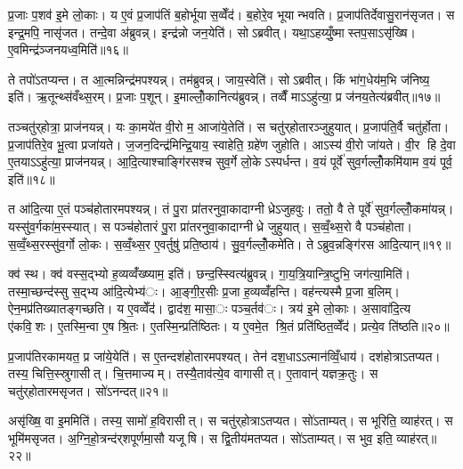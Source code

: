 प्र॒जाः प॒शव॑ इ॒मे लो॒काः। य ए॒वं प्र॒जाप॑तिं ब॒होर्भूयास॒व्वेँद॑। ब॒होरे॒व भूयान्भवति। प्र॒जाप॑तिर्देवासु॒रान॑सृजत। स इन्द्र॒मपि॒ नासृ॑जत। तन्दे॒वा अ॑ब्रुवन्न्। इन्द्र॑न्नो जन॒येति॑। सोऽब्रवीत्। यथा॒ऽहय्युँ॒ष्मास्तप॒साऽसृ॑ख्षि। ए॒वमिन्द्र॑ञ्जनयध्व॒मिति॑॥१६॥

ते तपो॑ऽतप्यन्त। त आ॒त्मन्निन्द्र॑मपश्यन्न्। तम॑ब्रुवन्न्। जाय॒स्वेति॑। सोऽब्रवीत्। किं भा॑ग॒धेय॑म॒भि ज॑निष्य॒ इति॑। ऋ॒तून्थ्स॑वँथ्स॒रम्। प्र॒जाः प॒शून्। इ॒माल्लोँ॒कानित्य॑ब्रुवन्न्। तव्वैँ माऽऽहु॑त्या॒ प्र ज॑नय॒तेत्य॑ब्रवीत्॥१७॥

तञ्चतु॑र्‌होत्रा॒ प्राज॑नयन्न्। यः का॒मये॑त वी॒रो म॒ आजा॑ये॒तेति॑। स चतु॑र्‌होतारञ्जुहुयात्। प्र॒जाप॑ति॒र्वै चतु॑र्होता। प्र॒जाप॑तिरे॒व भू॒त्वा प्रजा॑यते। ज॒जन॒दिन्द्र॑मिन्द्रि॒याय॒ स्वाहेति॒ ग्रहे॑ण जुहोति। आऽस्य॑ वी॒रो जा॑यते। वी॒र हि दे॒वा ए॒तयाऽऽहु॑त्या॒ प्राज॑नयन्न्। आ॒दि॒त्याश्चाङ्गि॑रसश्च सुव॒र्गे लो॒केऽस्पर्धन्त। व॒यं पूर्वे॑ सुव॒र्गल्लोँ॒कमि॑याम व॒यं पूर्व॒ इति॑॥१८॥

त आ॑दि॒त्या ए॒तं पञ्च॑होतारमपश्यन्न्। तं पु॒रा प्रा॑तरनुवा॒कादाग्नीध्रेऽजुहवुः। ततो॒ वै ते पूर्वे॑ सुव॒र्गल्लोँ॒कमा॑यन्न्। यस्सु॑व॒र्गका॑म॒स्स्यात्। स पञ्च॑होतारं पु॒रा प्रा॑तरनुवा॒कादाग्नीध्रे जुहुयात्। स॒व्वँ॒थ्स॒रो वै पञ्च॑होता। स॒व्वँ॒थ्स॒रस्सु॑व॒र्गो लो॒कः। स॒व्वँ॒थ्स॒र ए॒वर्तुषु॑ प्रति॒ष्ठाय॑। सु॒व॒र्गल्लोँ॒कमे॑ति। तेऽब्रुव॒न्नङ्गि॑रस आदि॒त्यान्॥१९॥

क्व॑ स्थ। क्व॑ वस्स॒द्भ्यो ह॒व्यव्वँ॑ख्ष्याम॒ इति॑। छन्द॒स्स्वित्य॑ब्रुवन्न्। गा॒य॒त्रि॒यान्त्रि॒ष्टुभि॒ जग॑त्या॒मिति॑। तस्मा॒च्छन्द॑स्सु स॒द्भ्य आ॑दि॒त्येभ्य॑ः। आ॒ङ्गी॒र॒सीः प्र॒जा ह॒व्यव्वँ॑हन्ति। वह॑न्त्यस्मै प्र॒जा ब॒लिम्। ऐन॒मप्र॑तिख्यातङ्गच्छति। य ए॒वव्वेँद॑। द्वाद॑श॒ मासा॒ः पञ्च॒र्तव॑ः। त्रय॑ इ॒मे लो॒काः। अ॒सावा॑दि॒त्य ए॑कवि॒शः। ए॒तस्मि॒न्वा ए॒ष श्रि॒तः। ए॒तस्मि॒न्प्रति॑ष्ठितः। य ए॒वमे॒त श्रि॒तं प्रति॑ष्ठित॒व्वेँद॑। प्रत्ये॒व ति॑ष्ठति॥२०॥


प्र॒जाप॑तिरकामयत॒ प्र जा॑ये॒येति॑। स ए॒तन्दश॑होतारमपश्यत्। तेन॑ दश॒धाऽऽत्मान॑व्विँ॒धाय॑। दश॑होत्राऽतप्यत। तस्य॒ चित्ति॒स्स्रुगासीत्। चि॒त्तमाज्यम्। तस्यै॒ताव॑त्ये॒व वागासीत्। ए॒तावान्॑ यज्ञक्र॒तुः। स चतु॑र्‌होतारमसृजत। सो॑ऽनन्दत्॥२१॥

असृ॑ख्षि॒ वा इ॒ममिति॑। तस्य॒ सामो॑ ह॒विरासीत्। स चतु॑र्‌होत्राऽतप्यत। सो॑ऽताम्यत्। स भूरिति॒ व्याह॑रत्। स भूमि॑मसृजत। अ॒ग्नि॒हो॒त्रन्द॑र्‌शपूर्णमा॒सौ यजूषि। स द्वि॒तीय॑मतप्यत। सो॑ऽताम्यत्। स भुव॒ इति॒ व्याह॑रत्॥२२॥

